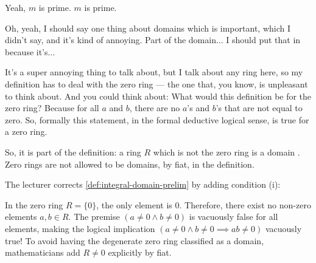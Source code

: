 \begin{speech}[00:16:05 - 00:17:09]
Yeah, $m$ is prime. $m$ is prime. 

Oh, yeah, I should say one thing about domains which is important, which I didn't say, and it's kind of annoying. Part of the domain... I should put that in because it's... 

It's a super annoying thing to talk about, but I talk about any ring here, so my definition has to deal with the zero ring --- the one that, you know, is unpleasant to think about. And you could think about: What would this definition be for the zero ring? Because for all $a$ and $b$, there are no $a$'s and $b$'s that are not equal to zero. So, formally this statement, in the formal deductive logical sense, is true for a zero ring.

So, it is part of the definition: a ring $R$ which is not the zero ring is a domain . Zero rings are not allowed to be domains, by fiat, in the definition. 
\end{speech}

\begin{content}
The lecturer corrects \cref{def:integral-domain-prelim} by adding condition (i):


\begin{steps}
In the zero ring $R = \{0\}$, the only element is $0$. Therefore, there exist no non-zero elements $a, b \in R$. The premise $(a \neq 0 \land b \neq 0)$ is vacuously false for all elements, making the logical implication $(a \neq 0 \land b \neq 0 \implies ab \neq 0)$ vacuously true! To avoid having the degenerate zero ring classified as a domain, mathematicians add $R \neq 0$ explicitly by fiat.
\end{steps}
\end{content}

